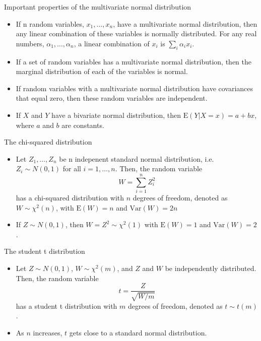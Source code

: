 \documentclass[presentation]{beamer}
\begin{document}
\begin{frame}[label={sec:org07a8292}]{Important properties of the multivariate normal distribution}
\begin{itemize}
\item If n random variables, \(x_1, \ldots, x_n\), have a multivariate
normal distribution, then any linear combination of these variables
is normally distributed. For any real numbers, \(\alpha_1, \ldots,
  \alpha_n\), a linear combination of \({x_i}\) is \(\sum_i \alpha_i x_i\).

\item If a set of random variables has a multivariate normal
distribution, then the marginal distribution of each of the
variables is normal.

\item If random variables with a multivariate normal distribution have
covariances that equal zero, then these random variables are
independent.

\item If \(X\) and \(Y\) have a bivariate normal distribution, then
\(\mathrm{E}(Y|X = x) = a + bx\), where \(a\) and \(b\) are constants.
\end{itemize}
\end{frame}

\begin{frame}[label={sec:orgd94b54b}]{The chi-squared distribution}
\begin{itemize}
\item Let \(Z_1, \ldots, Z_n\) be n indepenent standard normal distribution,
i.e. \(Z_i \sim N(0, 1)\) for all \(i = 1, \ldots, n\). Then, the random
variable
\[W = \sum_{i=1}^n Z^2_i \]
has a chi-squared distribution with \(n\) degrees of freedom, denoted as
\(W \sim \chi^2(n)\), with \(\mathrm{E}(W) = n\) and \(\mathrm{Var}(W) = 2n\)

\item If \(Z \sim N(0, 1)\), then \(W = Z^2 \sim \chi^2(1)\) with \(\mathrm{E}(W) =
  1\) and \(\mathrm{Var}(W) = 2\).
\end{itemize}
\end{frame}

\begin{frame}[label={sec:orgc8541a8}]{The student t distribution}
\begin{itemize}
\item Let \(Z \sim N(0, 1)\), \(W \sim \chi^2(m)\), and \(Z\) and \(W\) be
independently distributed. Then, the random variable
\[t = \frac{Z}{\sqrt{W/m}} \]
has a student t distribution with \(m\) degrees of freedom, denoted as
\(t \sim t(m)\).

\item As \(n\) increases, \(t\) gets close to a standard normal distribution.
\end{itemize}
\end{frame}
\end{document}

